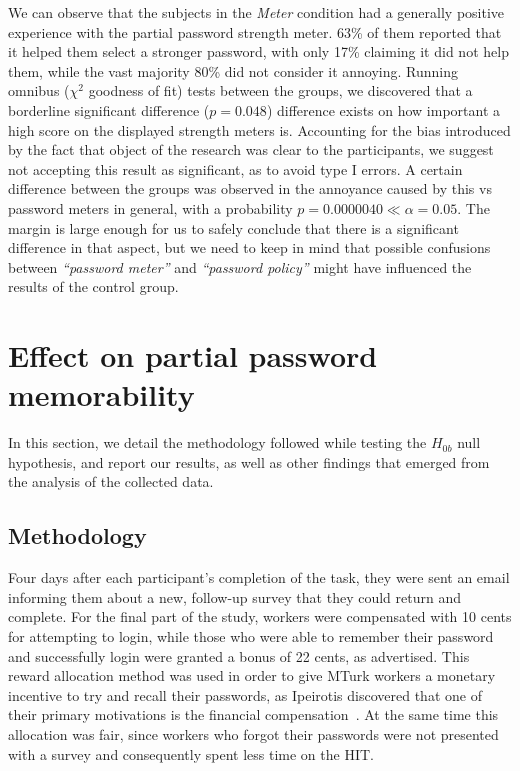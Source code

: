     We can observe that the subjects in the \emph{Meter} condition had a generally positive experience with the partial password strength meter. 63\% of them reported that it helped them select a stronger password, with only 17\% claiming it did not help them, while the vast majority 80\% did not consider it annoying. Running omnibus ($\chi^2$ goodness of fit) tests between the groups, we discovered that a borderline significant difference ($p=0.048$) difference exists on how important a high score on the displayed strength meters is. Accounting for the bias introduced by the fact that object of the research was clear to the participants, we suggest not accepting this result as significant, as to avoid type I errors. A certain difference between the groups was observed in the annoyance caused by this vs password meters in general, with a probability $p=0.0000040 \ll \alpha = 0.05$. The margin is large enough for us to safely conclude that there is a significant difference in that aspect, but we need to keep in mind that possible confusions between \emph{``password meter''} and \emph{``password policy''} might have influenced the results of the control group.

\section{Effect on partial password memorability}
  \label{sec:memorability}
  In this section, we detail the methodology followed while testing the $H_{0b}$ null hypothesis, and report our results, as well as other findings that emerged from the analysis of the collected data.

  \subsection{Methodology}
    \label{ssec:memorability_setup}
    Four days after each participant's completion of the task, they were sent an email informing them about a new, follow-up survey that they could return and complete. For the final part of the study, workers were compensated with 10 cents for attempting to login, while those who were able to remember their password and successfully login were granted a bonus of 22 cents, as advertised. This reward allocation method was used in order to give MTurk workers a monetary incentive to try and recall their passwords, as Ipeirotis discovered that one of their primary motivations is the financial compensation~\cite{mturk_demographic}. At the same time this allocation was fair, since workers who forgot their passwords were not presented with a survey and consequently spent less time on the HIT.

